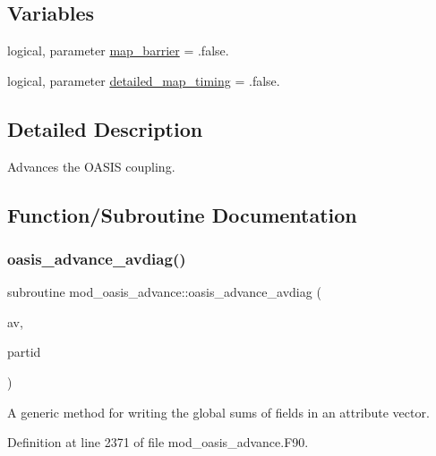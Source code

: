 \subsection*{Variables}
\begin{DoxyCompactItemize}
\item 
logical, parameter \hyperlink{namespacemod__oasis__advance_ac617024af9299c27eaeb9156f647b028}{map\+\_\+barrier} = .false.
\item 
logical, parameter \hyperlink{namespacemod__oasis__advance_aad8e5c2e16b0270a7da0800a14ae1e07}{detailed\+\_\+map\+\_\+timing} = .false.
\end{DoxyCompactItemize}


\subsection{Detailed Description}
Advances the O\+A\+S\+IS coupling. 

\subsection{Function/\+Subroutine Documentation}
\mbox{\label{namespacemod__oasis__advance_a6faf6ac09dd35d44e62daad5e09d7b24}} 
\subsubsection{\texorpdfstring{oasis\+\_\+advance\+\_\+avdiag()}{oasis\_advance\_avdiag()}}
{\footnotesize\ttfamily subroutine mod\+\_\+oasis\+\_\+advance\+::oasis\+\_\+advance\+\_\+avdiag (\begin{DoxyParamCaption}\item[{type(mct\+\_\+avect), intent(in)}]{av,  }\item[{integer(kind=ip\+\_\+i4\+\_\+p), intent(in)}]{partid }\end{DoxyParamCaption})\hspace{0.3cm}{\ttfamily [private]}}



A generic method for writing the global sums of fields in an attribute vector. 



Definition at line 2371 of file mod\+\_\+oasis\+\_\+advance.\+F90.

